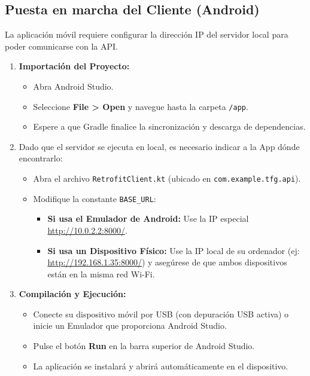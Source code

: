 \subsection{Puesta en marcha del Cliente (Android)}
La aplicación móvil requiere configurar la dirección IP del servidor local para poder comunicarse con la API.

\begin{enumerate}
    \item \textbf{Importación del Proyecto:}
    \begin{itemize}
        \item Abra Android Studio.
        \item Seleccione \textbf{File > Open} y navegue hasta la carpeta \texttt{/app}.
        \item Espere a que Gradle finalice la sincronización y descarga de dependencias.
    \end{itemize}

    \item Dado que el servidor se ejecuta en local, es necesario indicar a la App dónde encontrarlo:
    \begin{itemize}
        \item Abra el archivo \texttt{RetrofitClient.kt}\cite{retrofit_lib} (ubicado en \texttt{com.example.tfg.api}).
        \item Modifique la constante \texttt{BASE\_URL}:
        \begin{itemize}
            \item \textbf{Si usa el Emulador de Android:} Use la IP especial \url{http://10.0.2.2:8000/}.
            \item \textbf{Si usa un Dispositivo Físico:} Use la IP local de su ordenador (ej: \url{http://192.168.1.35:8000/}) y asegúrese de que ambos dispositivos están en la misma red Wi-Fi.
        \end{itemize}
    \end{itemize}

    \item \textbf{Compilación y Ejecución:}
    \begin{itemize}
        \item Conecte su dispositivo móvil por USB (con depuración USB activa) o inicie un Emulador que proporciona Android Studio.
        \item Pulse el botón \textbf{Run} en la barra superior de Android Studio.
        \item La aplicación se instalará y abrirá automáticamente en el dispositivo.
    \end{itemize}
\end{enumerate}

